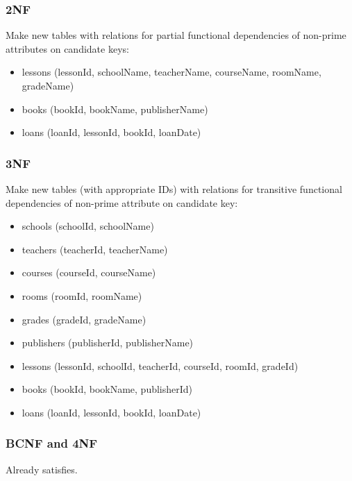 \documentclass[11pt]{article}
\begin{document}
\subsubsection{2NF}
\label{sec:orge350be8}
Make new tables with relations for partial functional dependencies of non-prime attributes on candidate keys:
\begin{itemize}
\item lessons (lessonId, schoolName, teacherName, courseName, roomName, gradeName)
\item books (bookId, bookName, publisherName)
\item loans (loanId, lessonId, bookId, loanDate)
\end{itemize}
\subsubsection{3NF}
\label{sec:org627722d}
Make new tables (with appropriate IDs) with relations for transitive functional dependencies of non-prime attribute on candidate key:
\begin{itemize}
\item schools (schoolId, schoolName)
\item teachers (teacherId, teacherName)
\item courses (courseId, courseName)
\item rooms (roomId, roomName)
\item grades (gradeId, gradeName)
\item publishers (publisherId, publisherName)
\item lessons (lessonId, schoolId, teacherId, courseId, roomId, gradeId)
\item books (bookId, bookName, publisherId)
\item loans (loanId, lessonId, bookId, loanDate)
\end{itemize}
\subsubsection{BCNF and 4NF}
\label{sec:org00e5b2a}
Already satisfies.
\end{document}
